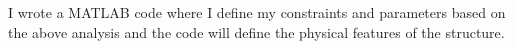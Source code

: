 \documentclass{article}
\begin{document}
I wrote a MATLAB code where I define my constraints and parameters based on the above analysis and the code will define the physical features of the structure.







%
%
%
%
%
\end{document}
